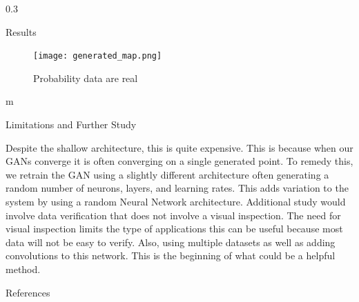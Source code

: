 \documentclass{msuposter}
\newcommand{\colwidth}{0.3\linewidth}
\begin{document}
\begin{frame}{}
\begin{columns}[t]
\begin{column}{\colwidth}
\begin{block}{Results}
\begin{figure}
  \texttt{[image: generated\_map.png]}
  	\caption{\label{fig:my-label} Probability data are real}
\end{figure} m


\end{block}


\begin{block}{Limitations and Further Study}

Despite the shallow architecture, this is quite expensive. This is because when our GANs converge it is often converging on a single generated point. To remedy this, we retrain the GAN using a slightly different architecture often generating a random number of neurons, layers, and learning rates. This adds variation to the system by using a random Neural Network architecture. Additional study would involve data verification that does not involve a visual inspection. The need for visual inspection limits the type of applications this can be useful because most data will not be easy to verify. Also, using multiple datasets as well as adding convolutions to this network. This is the beginning of what could be a helpful method. 

\end{block}


\begin{block}{References}
\scriptsize


\end{block}


\end{column}

\end{columns}
	\end{frame}
\end{document}
